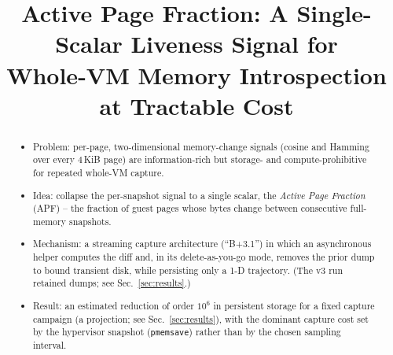 \documentclass[conference]{IEEEtran}
\title{Active Page Fraction: A Single-Scalar Liveness Signal for\\
Whole-VM Memory Introspection at Tractable Cost}
\author{\IEEEauthorblockN{TODO Author list}
\IEEEauthorblockA{TODO Affiliation\\
\texttt{TODO@email}}}
\begin{document}
\maketitle

\begin{abstract}
\begin{itemize}
  \item Problem: per-page, two-dimensional memory-change signals (cosine and
        Hamming over every 4\,KiB page) are information-rich but storage- and
        compute-prohibitive for repeated whole-VM capture.
  \item Idea: collapse the per-snapshot signal to a single scalar, the
        \emph{Active Page Fraction} (APF) -- the fraction of guest pages whose
        bytes change between consecutive full-memory snapshots.
  \item Mechanism: a streaming capture architecture (``B+3.1'') in which an
        asynchronous helper computes the diff and, in its delete-as-you-go
        mode, removes the prior dump to bound transient disk, while persisting
        only a 1-D trajectory. (The v3 run retained dumps; see
        Sec.~\ref{sec:results}.)
  \item Result: an estimated reduction of order $10^{6}$ in persistent
        storage for a fixed capture campaign (a projection; see
        Sec.~\ref{sec:results}), with the dominant capture cost set by the
        hypervisor snapshot (\texttt{pmemsave}) rather than by the chosen
        sampling interval.
\end{itemize}
\end{abstract}

\end{document}
